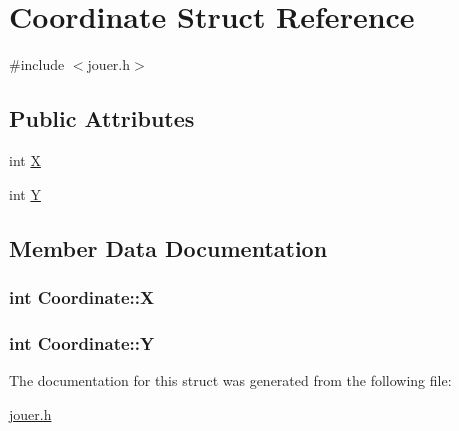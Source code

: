 \hypertarget{structCoordinate}{}\section{Coordinate Struct Reference}
\label{structCoordinate}


{\ttfamily \#include $<$jouer.\+h$>$}

\subsection*{Public Attributes}
\begin{DoxyCompactItemize}
\item 
int \hyperlink{structCoordinate_aec4cc10f8f54cb0270096af93fd9e1d6}{X}
\item 
int \hyperlink{structCoordinate_ae378244497aa6e51b1d74cdbfc452031}{Y}
\end{DoxyCompactItemize}


\subsection{Member Data Documentation}
\subsubsection[{\texorpdfstring{X}{X}}]{\setlength{\rightskip}{0pt plus 5cm}int Coordinate\+::X}\hypertarget{structCoordinate_aec4cc10f8f54cb0270096af93fd9e1d6}{}\label{structCoordinate_aec4cc10f8f54cb0270096af93fd9e1d6}
\subsubsection[{\texorpdfstring{Y}{Y}}]{\setlength{\rightskip}{0pt plus 5cm}int Coordinate\+::Y}\hypertarget{structCoordinate_ae378244497aa6e51b1d74cdbfc452031}{}\label{structCoordinate_ae378244497aa6e51b1d74cdbfc452031}


The documentation for this struct was generated from the following file\+:\begin{DoxyCompactItemize}
\item 
\hyperlink{jouer_8h}{jouer.\+h}\end{DoxyCompactItemize}
